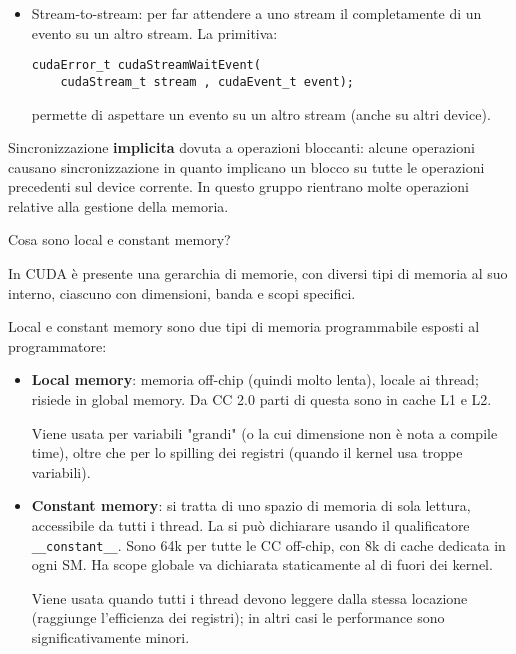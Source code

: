\documentclass[12pt, answers]{exam}
\begin{document}
\begin{questions}
\begin{solution}
\begin{itemize}
            \item Stream-to-stream: per far attendere a uno stream il completamente di un evento su un altro stream. La primitiva:
            \begin{verbatim}
cudaError_t cudaStreamWaitEvent(
    cudaStream_t stream , cudaEvent_t event);
            \end{verbatim}
            permette di aspettare un evento su un altro stream (anche su altri device).
        \end{itemize}
        
        Sincronizzazione \textbf{implicita} dovuta a operazioni bloccanti: alcune operazioni causano sincronizzazione in quanto implicano un blocco su tutte le operazioni precedenti sul device corrente. In questo gruppo rientrano molte operazioni relative alla gestione della memoria.
        
    \end{solution}
    
    \question Cosa sono local e constant memory?
    
    \begin{solution}
        In CUDA è presente una gerarchia di memorie, con diversi tipi di memoria al suo interno, ciascuno con dimensioni, banda e scopi specifici. 
        
        Local e constant memory sono due tipi di memoria programmabile esposti al programmatore: 
        \begin{itemize}
            \item \textbf{Local memory}: memoria off-chip (quindi molto lenta), locale ai thread; risiede in global memory. Da CC 2.0 parti di questa sono in cache L1 e L2.
            
            Viene usata per variabili "grandi" (o la cui dimensione non è nota a compile time), oltre che per lo spilling dei registri (quando il kernel usa troppe variabili).
            
            \item \textbf{Constant memory}: si tratta di uno spazio di memoria di sola lettura, accessibile da tutti i thread. La si può dichiarare usando il qualificatore \texttt{\_\_constant\_\_}. Sono 64k per tutte le CC off-chip, con 8k di cache dedicata in ogni SM. Ha scope globale va dichiarata staticamente al di fuori dei kernel.
            
            Viene usata quando tutti i thread devono leggere dalla stessa locazione (raggiunge l'efficienza dei registri); in altri casi le performance sono significativamente minori.
        \end{itemize}
        

\end{solution}
\end{questions}
\end{document}
